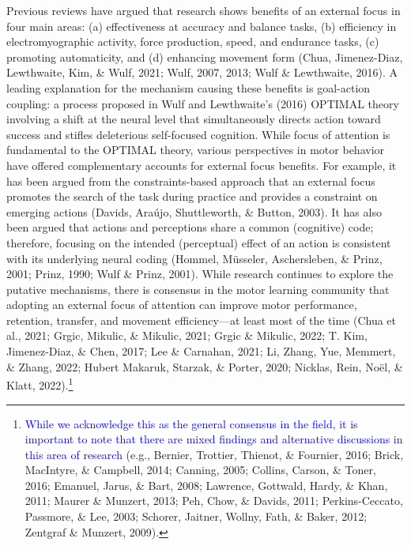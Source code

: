 \documentclass[
  man, donotrepeattitle,floatsintext]{apa7}
\begin{document}
Previous reviews have argued that research shows benefits of an external focus in four main areas: (a) effectiveness at accuracy and balance tasks, (b) efficiency in electromyographic activity, force production, speed, and endurance tasks, (c) promoting automaticity, and (d) enhancing movement form (Chua, Jimenez-Diaz, Lewthwaite, Kim, \& Wulf, 2021; Wulf, 2007, 2013; Wulf \& Lewthwaite, 2016). A leading explanation for the mechanism causing these benefits is goal-action coupling: a process proposed in Wulf and Lewthwaite's (2016) OPTIMAL theory involving a shift at the neural level that simultaneously directs action toward success and stifles deleterious self-focused cognition. While focus of attention is fundamental to the OPTIMAL theory, various perspectives in motor behavior have offered complementary accounts for external focus benefits. For example, it has been argued from the constraints-based approach that an external focus promotes the search of the task during practice and provides a constraint on emerging actions (Davids, Araújo, Shuttleworth, \& Button, 2003). It has also been argued that actions and perceptions share a common (cognitive) code; therefore, focusing on the intended (perceptual) effect of an action is consistent with its underlying neural coding (Hommel, Müsseler, Aschersleben, \& Prinz, 2001; Prinz, 1990; Wulf \& Prinz, 2001). While research continues to explore the putative mechanisms, there is consensus in the motor learning community that adopting an external focus of attention can improve motor performance, retention, transfer, and movement efficiency---at least most of the time (Chua et al., 2021; Grgic, Mikulic, \& Mikulic, 2021; Grgic \& Mikulic, 2022; T. Kim, Jimenez-Diaz, \& Chen, 2017; Lee \& Carnahan, 2021; Li, Zhang, Yue, Memmert, \& Zhang, 2022; Hubert Makaruk, Starzak, \& Porter, 2020; Nicklas, Rein, Noël, \& Klatt, 2022).\footnote{\textcolor{blue}{While we acknowledge this as the general consensus in the field, it is important to note that there are mixed findings and alternative discussions in this area of research} (e.g., Bernier, Trottier, Thienot, \& Fournier, 2016; Brick, MacIntyre, \& Campbell, 2014; Canning, 2005; Collins, Carson, \& Toner, 2016; Emanuel, Jarus, \& Bart, 2008; Lawrence, Gottwald, Hardy, \& Khan, 2011; Maurer \& Munzert, 2013; Peh, Chow, \& Davids, 2011; Perkins-Ceccato, Passmore, \& Lee, 2003; Schorer, Jaitner, Wollny, Fath, \& Baker, 2012; Zentgraf \& Munzert, 2009).}
\end{document}
